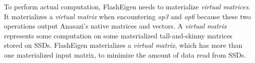 


To perform actual computation, FlashEigen needs to materialize
\textit{virtual matrices}. It materializes a \textit{virtual matrix} when
encountering \textit{op3} and \textit{op6} because these two operations
output Anasazi's native matrices and vectors.
A \textit{virtual matrix} represents some computation on some materialized
tall-and-skinny matrices stored on SSDs. FlashEigen materializes
a \textit{virtual matrix}, which has more than one materialized input matrix,
to minimize the amount of data read from SSDs.

